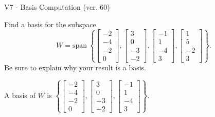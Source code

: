 \begin{exercise}
  \begin{exerciseTitle}V7 - Basis Computation (ver. 60)\end{exerciseTitle}
  \begin{exerciseStatement}
    Find a basis for the subspace 
\[W=\mathrm{span}\ \left\{\left[\begin{array}{r}
-2 \\
-4 \\
-2 \\
0
\end{array}\right] , \left[\begin{array}{r}
3 \\
0 \\
-3 \\
-2
\end{array}\right] , \left[\begin{array}{r}
-1 \\
1 \\
-4 \\
3
\end{array}\right] , \left[\begin{array}{r}
1 \\
5 \\
-2 \\
3
\end{array}\right]\right\}.\]
 Be sure to explain why your result is a basis.


  \end{exerciseStatement}
  \begin{exerciseAnswer}
   A basis of \(W\) is  \(\left\{\left[\begin{array}{r}
-2 \\
-4 \\
-2 \\
0
\end{array}\right] , \left[\begin{array}{r}
3 \\
0 \\
-3 \\
-2
\end{array}\right] , \left[\begin{array}{r}
-1 \\
1 \\
-4 \\
3
\end{array}\right]\right\}\).
  


  \end{exerciseAnswer}
\end{exercise}